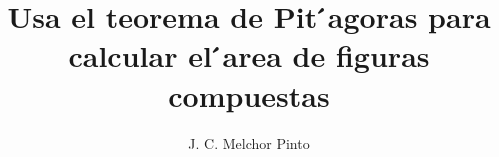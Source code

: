 \documentclass[12pt]{guia}
\title{Usa el teorema de Pit ́agoras para calcular el  ́area de figuras compuestas}
\author{J. C. Melchor Pinto}
\begin{document}
\pagestyle{headandfoot}
\addpoints
\INFO
\printanswers

\newpage
\begin{questions}
    
    
    
    
    
\end{questions}
\end{document}
